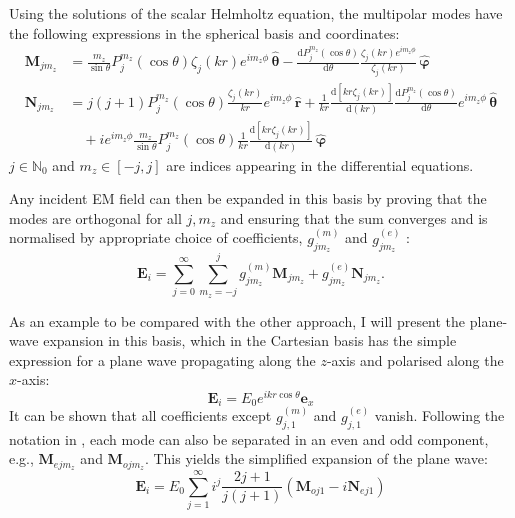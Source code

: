 Using the solutions of the scalar Helmholtz equation, the multipolar modes have the following expressions in the spherical basis and coordinates:
\begin{align*}
\mathbf{M}_{jm_z} &= \frac{m_z}{\sin \theta} P_j^{m_z}(\cos\theta) \zeta_j(kr) e^{im_z \phi} \, \boldsymbol{\hat{\theta}} - \frac{\mathrm{d} P_j^{m_z}(\cos\theta)}{\mathrm{d} \theta} \frac{\zeta_j(kr) e^{im_z \phi}}{\zeta_j(kr)} \, \boldsymbol{\hat{\varphi}} \\
\mathbf{N}_{jm_z} &= j(j + 1) P_j^{m_z}(\cos\theta) \frac{\zeta_j(kr)}{kr} e^{im_z \phi} \, \mathbf{\hat{r}} + \frac{1}{kr} \frac{\mathrm{d} \left[ kr \zeta_j(kr) \right]}{\mathrm{d} (kr)} \frac{\mathrm{d} P_j^{m_z}(\cos\theta)}{\mathrm{d} \theta} e^{im_z \phi} \, \boldsymbol{\hat{\theta}} \\
&\quad + i e^{im_z \phi} \frac{m_z}{\sin \theta} P_j^{m_z}(\cos\theta) \frac{1}{kr} \frac{\mathrm{d} \left[ kr \zeta_j(kr) \right]}{\mathrm{d} (kr)} \, \boldsymbol{\hat{\varphi}}
\end{align*}
\( j \in \mathbb{N}_0 \) and \( m_z \in [-j, j] \) are indices appearing in the differential equations.

Any incident EM field can then be expanded in this basis by proving that the modes are orthogonal for all \( j, m_z \) and ensuring that the sum converges and is normalised by appropriate choice of coefficients, \( g^{(m)}_{jm_z} \) and \( g^{(e)}_{jm_z} \) \cite{bohren}:
\begin{equation}\label{eq:E_i_expansion}
    \mathbf{E}_i = \sum_{j=0}^\infty \sum_{m_z=-j}^j g_{jm_z}^{(m)} \mathbf{M}_{jm_z} + g_{jm_z}^{(e)} \mathbf{N}_{jm_z}.
\end{equation}

As an example to be compared with the other approach, I will present the plane-wave expansion in this basis, which in the Cartesian basis has the simple expression for a plane wave propagating along the \( z \)-axis and polarised along the \( x \)-axis:
\begin{equation}\label{eq:PW_cart}
     \mathbf{E}_i = E_0 e^{ikr \cos\theta} \mathrm{\mathbf{e}}_x
\end{equation}
It can be shown that all coefficients except \( g^{(m)}_{j,1} \) and \( g^{(e)}_{j,1} \) vanish. Following the notation in \cite{bohren}, each mode can also be separated in an even and odd component, e.g., \( \mathbf{M}_{ejm_z} \) and \( \mathbf{M}_{ojm_z} \). This yields the simplified expansion of the plane wave:
\begin{equation}\label{eq:PW_sph}
    \mathbf{E}_i = E_0 \sum_{j=1}^\infty i^j \frac{2j+1}{j(j+1)} (\mathbf{M}_{oj1} - i \mathbf{N}_{ej1})
\end{equation}

